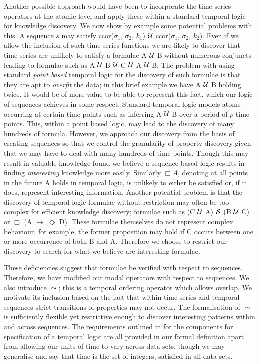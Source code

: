 Another possible approach would have been to incorporate the time
series operators at the atomic level and apply these within a standard
temporal logic for knowledge discovery. We now show by example some
potential problems with this. A sequence $s$ may satisfy
ccor($\sigma_1$, $\sigma_2$, $k_1$) ${\cal U}$ ccor($\sigma_1$,
$\sigma_2$, $k_2$). Even if we allow the inclusion of such time series
functions we are likely to discover that time series are unlikely to
satisfy a formulae A ${\cal U}$ B without numerous conjuncts leading
to formulae such as A ${\cal U}$ B ${\cal U}$ C ${\cal U}$ A ${\cal U}$
B. The problem with using standard {\em point based} temporal logic
for the discovery of 
such formulae is that they are apt to {\em overfit} the data; in this 
brief example we have A ${\cal U}$ B holding twice. It would be of
more value to be able to represent this fact, which our logic of
sequences achieves in some respect. Standard temporal logic models
atoms occurring at certain time points such as inferring A ${\cal U}$ B over
a period of $p$ time points. This, within a point based
logic, may lead to the discovery of many hundreds of
formula. However, we approach our discovery from the
basis of creating sequences so that we control the granularity of 
property discovery given that we may have to
deal with many hundreds of time points.  Though this may result in
valuable knowledge found we 
believe a sequence based logic results in finding {\em interesting}
knowledge more easily.
Similarly
$\Box A$, denoting at all points in the future A holds in temporal
logic, is unlikely to 
either be satisfied or, if it does, represent interesting
information. Another potential problem is that the discovery of
temporal logic formulae without restriction may often be too complex for
efficient knowledge discovery; formulae such as (C ${\cal U}$ A)
${\cal S}$ (B ${\cal U}$ C) or $\Box$ (A $\to$ $\Diamond$ D). These
formulae themselves do not represent complex behaviour, for example,
the former proposition may hold if C occurs between one or more
occurrence of both B and A. Therefore we choose to
restrict our discovery to search for what we believe are interesting
formulae.
\medskip

These
deficiencies suggest that formulae be verified with respect to
sequences. Therefore, we have modified our modal operators with
respect to sequences. We also introduce $\leadsto$; this is a temporal
ordering operator which allows overlap. We motivate its inclusion
based on the fact that within time series and temporal sequences
strict transitions of properties may not occur. The formalisation of
$\leadsto$ is sufficiently flexible yet restrictive enough to discover
interesting patterns within and across sequences. The requirements
outlined in \cite{ghr94} for the components for specification of a
temporal logic are all provided in our formal definition apart from
allowing our units of time to vary across data sets, though we may
generalise and say that time is the set of integers, satisfied in all
data sets. 

